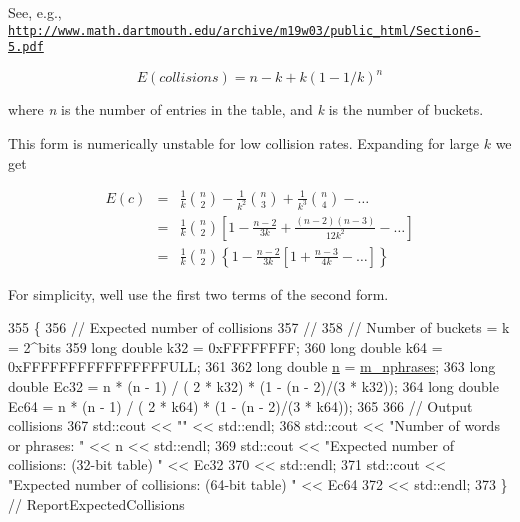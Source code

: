 See, e.\+g., \href{http://www.math.dartmouth.edu/archive/m19w03/public_html/Section6-5.pdf}{\tt http\+://www.\+math.\+dartmouth.\+edu/archive/m19w03/public\+\_\+html/\+Section6-\/5.\+pdf}

\[ E(collisions) = n - k + k (1 - 1/k)^n \]

where {\itshape n} is the number of entries in the table, and {\itshape k} is the number of buckets.

This form is numerically unstable for low collision rates. Expanding for large $ k $ we get

\begin{eqnarray*} E(c) &=& \frac{1}{k} \binom{n}{2} - \frac{1}{{{k^2}}} \binom{n}{3} + \frac{1}{{{k^3}}} \binom{n}{4} - \ldots \\ &=& \frac{1}{k} \binom{n}{2} \left[ {1 - \frac{{n - 2}}{{3k}} + \frac{{\left( {n - 2} \right) \left( {n - 3} \right)}}{{12{k^2}}} - \ldots } \right] \\ &=& \frac{1}{k} \binom{n}{2} \left\{ {1 - \frac{{n - 2}}{{3k}} \left[ {1 + \frac{{n - 3}}{{4k}} - \ldots } \right]} \right\} \end{eqnarray*}

For simplicity, we\textquotesingle{}ll use the first two terms of the second form. 
\begin{DoxyCode}
355   \{
356     \textcolor{comment}{// Expected number of collisions}
357     \textcolor{comment}{//}
358     \textcolor{comment}{// Number of buckets = k = 2^bits}
359     \textcolor{keywordtype}{long} \textcolor{keywordtype}{double} k32 = 0xFFFFFFFF;
360     \textcolor{keywordtype}{long} \textcolor{keywordtype}{double} k64 = 0xFFFFFFFFFFFFFFFFULL;
361 
362     \textcolor{keywordtype}{long} \textcolor{keywordtype}{double} \hyperlink{namespacesample-rng-plot_aeb5ee5c431e338ef39b7ac5431242e1d}{n} = \hyperlink{classns3_1_1Hash_1_1Example_1_1Dictionary_a9b178dadc9f65ac92d4be0e0cee4eea8}{m\_nphrases};
363     \textcolor{keywordtype}{long} \textcolor{keywordtype}{double} Ec32 = n * (n - 1) / ( 2 * k32) * (1 - (n - 2)/(3 * k32));
364     \textcolor{keywordtype}{long} \textcolor{keywordtype}{double} Ec64 = n * (n - 1) / ( 2 * k64) * (1 - (n - 2)/(3 * k64));
365       
366     \textcolor{comment}{// Output collisions}
367     std::cout << \textcolor{stringliteral}{""} << std::endl;
368     std::cout << \textcolor{stringliteral}{"Number of words or phrases: "} << n << std::endl;
369     std::cout << \textcolor{stringliteral}{"Expected number of collisions: (32-bit table) "} << Ec32
370               << std::endl;
371     std::cout << \textcolor{stringliteral}{"Expected number of collisions: (64-bit table) "} << Ec64
372               << std::endl;
373   \}  \textcolor{comment}{// ReportExpectedCollisions}
\end{DoxyCode}
